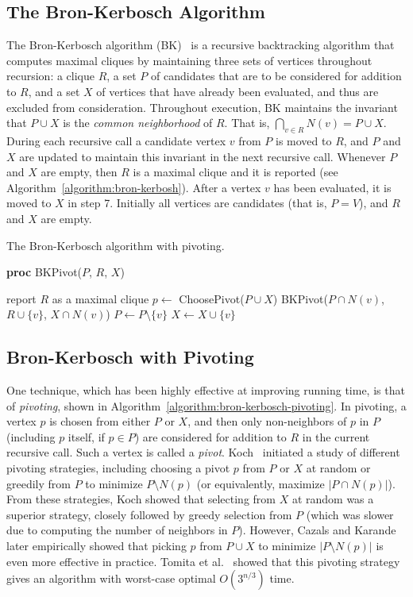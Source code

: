 \documentclass[final,1p]{elsarticle-modified}
\begin{document}
\subsection{The Bron-Kerbosch Algorithm}
The Bron-Kerbosch algorithm (BK)~\cite{bron-kerbosch-73} is a recursive backtracking algorithm that computes maximal cliques by maintaining three sets of vertices throughout recursion: a clique $R$, a set $P$ of candidates that are to be considered for addition to $R$, and a set $X$ of vertices that have already been evaluated, and thus are excluded from consideration. Throughout execution, BK maintains the invariant that $P\cup X$ is the \emph{common neighborhood} of $R$. That is, $\bigcap_{v\in R}N(v) = P\cup X$. During each recursive call a candidate vertex $v$ from $P$ is moved to $R$, and $P$ and $X$ are updated to maintain this invariant in the next recursive call. Whenever $P$ and $X$ are empty, then $R$ is a maximal clique and it is reported (see Algorithm~\ref{algorithm:bron-kerbosh}). After a vertex $v$ has been evaluated, it is moved to $X$ in step 7. Initially all vertices are candidates (that is, $P=V$), and $R$ and $X$ are empty.

\begin{algorithm}[!htb]
\caption{The Bron-Kerbosch algorithm with pivoting.}
\label{algorithm:bron-kerbosch-pivoting}
{\bf proc} BKPivot($P$, $R$, $X$)
\begin{algorithmic}[1]
    \State report $R$ as a maximal clique
\EndIf
\State $p \leftarrow $ ChoosePivot($P\cup X$)
    \State BKPivot($P\cap N(v)$, $R\cup\{v\}$, $X\cap N(v)$)
    \State $P \leftarrow P \setminus \{v\}$
    \State $X \leftarrow X \cup \{v\}$
\EndFor
\end{algorithmic}
\end{algorithm}


\subsection{Bron-Kerbosch with Pivoting}
One technique, which has been highly effective at improving running time, is that of \emph{pivoting}, shown in Algorithm~\ref{algorithm:bron-kerbosch-pivoting}. In pivoting, a vertex $p$ is chosen from either $P$ or $X$, and then only non-neighbors of $p$ in $P$ (including $p$ itself, if $p\in P$) are considered for addition to $R$ in the current recursive call. Such a vertex is called a \emph{pivot}. Koch~\cite{koch2001} initiated a study of different pivoting strategies, including choosing a pivot $p$ from $P$ or $X$ at random or greedily from $P$ to minimize $P\setminus N(p)$ (or equivalently, maximize $|P\cap N(p)|$). From these strategies, Koch showed that selecting from $X$ at random was a superior strategy, closely followed by greedy selection from $P$ (which was slower due to computing the number of neighbors in $P$). However, Cazals and Karande~\cite{cazals-karande-2006} later empirically showed that picking $p$ from $P\cup X$ to minimize $|P\setminus N(p)|$ is even more effective in practice. Tomita et al.~\cite{tomita-2006} showed that this pivoting strategy gives an algorithm with worst-case optimal $O(3^{n/3})$ time.
\end{document}
